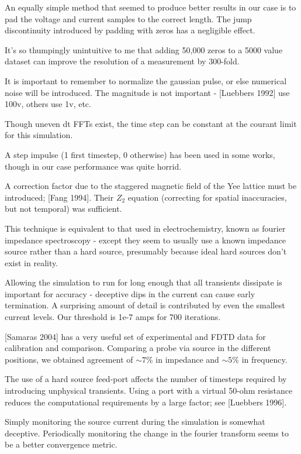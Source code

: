 \documentclass[paper.tex]{subfiles}
\begin{document}
An equally simple method that seemed to produce better results in our case is to pad the voltage and current samples to the correct length. The jump discontinuity introduced by padding with zeros has a negligible effect.

It's so thumpingly unintuitive to me that adding 50,000 zeros to a 5000 value dataset can improve the resolution of a measurement by 300-fold.

It is important to remember to normalize the gaussian pulse, or else numerical noise will be introduced. The magnitude is not important - [Luebbers 1992] use 100v, others use 1v, etc.

Though uneven dt FFTs exist, the time step can be constant at the courant limit for this simulation.

A step impulse (1 first timestep, 0 otherwise) has been used in some works, though in our case performance was quite horrid.

A correction factor due to the staggered magnetic field of the Yee lattice must be introduced; [Fang 1994]. Their $Z_2$ equation (correcting for spatial inaccuracies, but not temporal) was sufficient.


This technique is equivalent to that used in electrochemistry, known as fourier impedance spectroscopy - except they seem to usually use a known impedance source rather than a hard source, presumably because ideal hard sources don't exist in reality.

Allowing the simulation to run for long enough that all transients dissipate is important for accuracy - deceptive dips in the current can cause early termination. A surprising amount of detail is contributed by even the smallest current levels. Our threshold is 1e-7 amps for 700 iterations.

[Samaras 2004] has a very useful set of experimental and FDTD data for calibration and comparison. Comparing a probe via source in the different positions, we obtained agreement of $\sim 7\%$ in impedance and $\sim 5\%$ in frequency.

The use of a hard source feed-port affects the number of timesteps required by introducing unphysical transients. Using a port with a virtual 50-ohm resistance reduces the computational requirements by a large factor; see [Luebbers 1996].

Simply monitoring the source current during the simulation is somewhat deceptive. Periodically monitoring the change in the fourier transform seems to be a better convergence metric.
\end{document}
